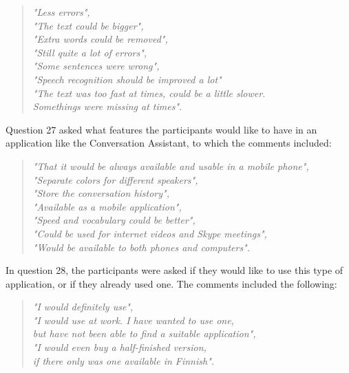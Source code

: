 \documentclass[english, 12pt, a4paper, pdftex, elec, utf8]{aaltothesis}
\renewcommand{\baselinestretch}{1.02}
\begin{document}
\begin{quote}
	\centering
	\renewcommand{\baselinestretch}{1.4}
	\textit{
		"Less errors", \\
		"The text could be bigger", \\
		"Extra words could be removed", \\
		"Still quite a lot of errors", \\
		"Some sentences were wrong", \\
		"Speech recognition should be improved a lot" \\
		"The text was too fast at times, could be a little slower. \\ Somethings were missing at times".}
\end{quote}
\vspace{1mm}
Question 27 asked what features the participants would like to have in an application like the Conversation Assistant, to which the comments included:
\begin{quote}
	\centering
	\renewcommand{\baselinestretch}{1.4}
	\textit{
		"That it would be always available and usable in a mobile phone", \\
		"Separate colors for different speakers", \\
		"Store the conversation history", \\
		"Available as a mobile application", \\
		"Speed and vocabulary could be better", \\
		"Could be used for internet videos and Skype meetings", \\
		\vspace{2mm}
		"Would be available to both phones and computers".}
\end{quote}
\vspace{1mm}
In question 28, the participants were asked if they would like to use this type of application, or if they already used one. The comments included the following:
\begin{quote}
	\centering
	\renewcommand{\baselinestretch}{1.4}
	\textit{
		"I would definitely use", \\
		"I would use at work. I have wanted to use one, \\ \vspace{-2.5mm} but have not been able to find a suitable application", \\
		\vspace{2mm}
		"I would even buy a half-finished version, \\ if there only was one available in Finnish".}
\end{quote}
\end{document}

